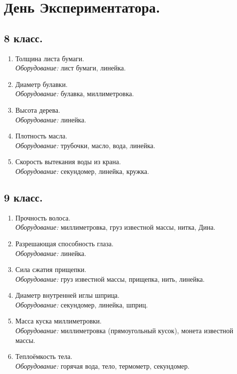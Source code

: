 \documentclass[12pt]{article}
\newlength{\h}
\newlength{\x}
\begin{document}
\clearpage

\section{День Экспериментатора. }
\label{sec:dayexp}

\subsection{8 класс. }
\label{sec:dayexp8}

\begin{enumerate}
\item Толщина листа бумаги.\\
  \textit{Оборудование:} лист бумаги, линейка.
\item Диаметр булавки. \\
  \textit{Оборудование:} булавка, миллиметровка.
\item Высота дерева.\\
  \textit{Оборудование:} линейка.
\item Плотность масла.\\
  \textit{Оборудование:} трубочки, масло, вода, линейка.
\item Скорость вытекания воды из крана.\\
  \textit{Оборудование:} секундомер, линейка, кружка.
\end{enumerate}

\subsection{9 класс.}
\label{sec:dayexp9}

\begin{enumerate}
\item Прочность волоса.\\
  \textit{Оборудование:} миллиметровка, груз известной массы, нитка,
  Дина. 
\item Разрешающая способность глаза.\\
  \textit{Оборудование:} линейка.
\item Сила сжатия прищепки. \\
  \textit{Оборудование:} груз известной массы, прищепка, нить, линейка.
\item Диаметр внутренней иглы шприца. \\
  \textit{Оборудование:} секундомер, линейка, шприц.
\item Масса куска миллиметровки. \\
  \textit{Оборудование:} миллиметровка (прямоугольный кусок), монета
  известной массы. 
\item Теплоёмкость тела.\\
  \textit{Оборудование:} горячая вода, тело, термометр, секундомер.
\end{enumerate}
\end{document}
